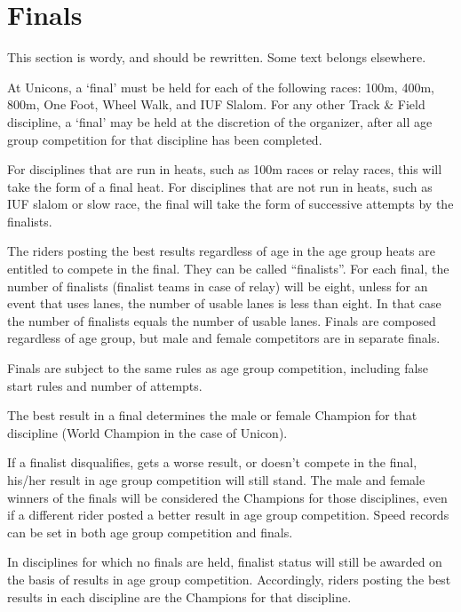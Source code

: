 \section{Finals}

\begin{comment2016}
This section is wordy, and should be rewritten.
Some text belongs elsewhere.
\end{comment2016}

At Unicons, a `final' must be held for each of the following races: 100m, 400m, 800m, One Foot, Wheel Walk, and IUF Slalom.
For any other Track \& Field discipline, a `final' may be held at the discretion of the organizer, after all age group competition for that discipline has been completed.

For disciplines that are run in heats, such as 100m races or relay races, this will take the form of a final heat.
For disciplines that are not run in heats, such as IUF slalom or slow race, the final will take the form of successive attempts by the finalists.

The riders posting the best results regardless of age in the age group heats are entitled to compete in the final.
They can be called ``finalists''.
For each final, the number of finalists (finalist teams in case of relay) will be eight, unless for an event that uses lanes, the number of usable lanes is less than eight.
In that case the number of finalists equals the number of usable lanes.
Finals are composed regardless of age group, but male and female competitors are in separate finals.

Finals are subject to the same rules as age group competition, including false start rules and number of attempts.

The best result in a final determines the male or female Champion for that discipline (World Champion in the case of Unicon).

If a finalist disqualifies, gets a worse result, or doesn't compete in the final, his/her result in age group competition will still stand.
The male and female winners of the finals will be considered the Champions for those disciplines, even if a different rider posted a better result in age group competition.
Speed records can be set in both age group competition and finals.

In disciplines for which no finals are held, finalist status will still be awarded on the basis of results in age group competition.
Accordingly, riders posting the best results in each discipline are the Champions for that discipline.

